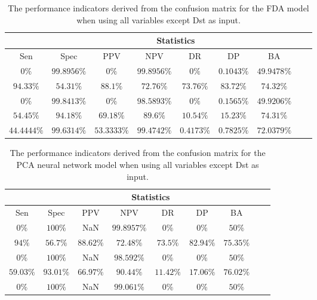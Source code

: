 \begin{table}[!ht]
	\centering
	\begin{tabular}{|c|c|c|c|c|c|c|c|c|}
		\hline
		 & \multicolumn{7}{c|}{Statistics} \\ \hline
		Sen & Spec & PPV & NPV & DR & DP & BA \\ \hline
		$0\%$ & $99.8956\%$ & $0\%$ & $99.8956\%$ & $0\%$ & $0.1043\%$ & $49.9478\%$ \\ \hline
		$94.33\%$ & $54.31\%$ & $88.1\%$ & $72.76\%$ & $73.76\%$ & $83.72\%$ & $74.32\%$ \\ \hline
		$0\%$ & $99.8413\%$ & $0\%$ & $98.5893\%$ & $0\%$ & $0.1565\%$ & $49.9206\%$ \\ \hline
		$54.45\%$ & $94.18\%$ & $69.18\%$ & $89.6\%$ & $10.54\%$ & $15.23\%$ & $74.31\%$ \\ \hline
		$44.4444\%$ & $99.6314\%$ & $53.3333\%$ & $99.4742\%$ & $0.4173\%$ & $0.7825\%$ & $72.0379\%$ \\ \hline
	\end{tabular}
	\caption{The performance indicators derived from the confusion matrix for the FDA model when using all variables except Dst as input.}
	\label{tab:cs:noDst:fda}
\end{table}

\begin{table}[!ht]
	\centering
	\begin{tabular}{|c|c|c|c|c|c|c|c|c|}
		\hline
		 & \multicolumn{7}{c|}{Statistics} \\ \hline
		Sen & Spec & PPV & NPV & DR & DP & BA \\ \hline
		$0\%$ & $100\%$ & NaN & $99.8957\%$ & $0\%$ & $0\%$ & $50\%$ \\ \hline
		$94\%$ & $56.7\%$ & $88.62\%$ & $72.48\%$ & $73.5\%$ & $82.94\%$ & $75.35\%$ \\ \hline
		$0\%$ & $100\%$ & NaN & $98.592\%$ & $0\%$ & $0\%$ & $50\%$ \\ \hline
		$59.03\%$ & $93.01\%$ & $66.97\%$ & $90.44\%$ & $11.42\%$ & $17.06\%$ & $76.02\%$ \\ \hline
		$0\%$ & $100\%$ & NaN & $99.061\%$ & $0\%$ & $0\%$ & $50\%$ \\ \hline
	\end{tabular}
	\caption{The performance indicators derived from the confusion matrix for the PCA neural network model when using all variables except Dst as input.}
	\label{tab:cs:noDst:pcaNNet}
\end{table}

